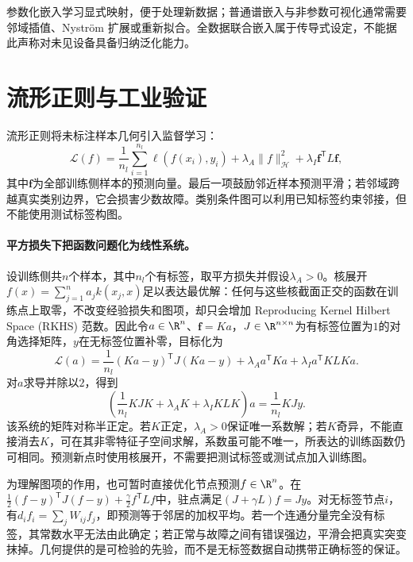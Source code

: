 参数化嵌入学习显式映射，便于处理新数据；普通谱嵌入与非参数可视化通常需要邻域插值、Nystr\"om 扩展或重新拟合。全数据联合嵌入属于传导式设定，不能据此声称对未见设备具备归纳泛化能力。

\section{流形正则与工业验证}
流形正则将未标注样本几何引入监督学习\cite{belkin2006regularization}：
\begin{equation}
 \mathcal L(f)=\frac1{n_l}\sum_{i=1}^{n_l}\ell(f(x_i),y_i)
 +\lambda_A\|f\|_{\mathcal H}^2+\lambda_I\bm f^{\mathsf T}L\bm f,
\end{equation}
其中$\bm f$为全部训练侧样本的预测向量。最后一项鼓励邻近样本预测平滑；若邻域跨越真实类别边界，它会损害少数故障。类别条件图可以利用已知标签约束邻接，但不能使用测试标签构图。

\paragraph{平方损失下把函数问题化为线性系统。}
设训练侧共$n$个样本，其中$n_l$个有标签，取平方损失并假设$\lambda_A>0$。核展开$f(x)=\sum_{j=1}^na_jk(x_j,x)$足以表达最优解：任何与这些核截面正交的函数在训练点上取零，不改变经验损失和图项，却只会增加 Reproducing Kernel Hilbert Space (RKHS) 范数。因此令$a\in\R^n$、$\bm f=Ka$，$J\in\R^{n\times n}$为有标签位置为$1$的对角选择矩阵，$y$在无标签位置补零，目标化为
\begin{equation}
 \mathcal L(a)=\frac1{n_l}(Ka-y)^{\mathsf T}J(Ka-y)
 +\lambda_Aa^{\mathsf T}Ka+\lambda_Ia^{\mathsf T}KLKa.
\end{equation}
对$a$求导并除以$2$，得到
\begin{equation}
 \left(\frac1{n_l}KJK+\lambda_AK+\lambda_IKLK\right)a
 =\frac1{n_l}KJy.
\end{equation}
该系统的矩阵对称半正定。若$K$正定，$\lambda_A>0$保证唯一系数解；若$K$奇异，不能直接消去$K$，可在其非零特征子空间求解，系数虽可能不唯一，所表达的训练函数仍可相同。预测新点时使用核展开，不需要把测试标签或测试点加入训练图。

为理解图项的作用，也可暂时直接优化节点预测$f\in\R^n$。在$\frac12(f-y)^{\mathsf T}J(f-y)+\frac\gamma2f^{\mathsf T}Lf$中，驻点满足$(J+\gamma L)f=Jy$。对无标签节点$i$，有$d_if_i=\sum_jW_{ij}f_j$，即预测等于邻居的加权平均。若一个连通分量完全没有标签，其常数水平无法由此确定；若正常与故障之间有错误强边，平滑会把真实突变抹掉。几何提供的是可检验的先验，而不是无标签数据自动携带正确标签的保证。

